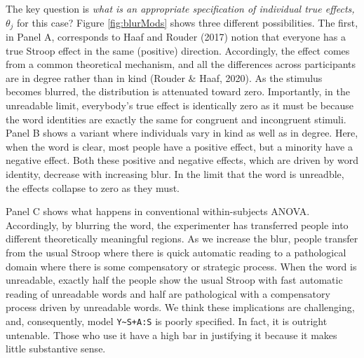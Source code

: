\documentclass[
  english,
  ,man]{apa6}
\begin{document}
The key question is \emph{what is an appropriate specification of individual true effects, \(\theta_j\)} for this case? Figure \ref{fig:blurMods} shows three different possibilities. The first, in Panel A, corresponds to Haaf and Rouder (2017) notion that everyone has a true Stroop effect in the same (positive) direction. Accordingly, the effect comes from a common theoretical mechanism, and all the differences across participants are in degree rather than in kind (Rouder \& Haaf, 2020). As the stimulus becomes blurred, the distribution is attenuated toward zero. Importantly, in the unreadable limit, everybody's true effect is identically zero as it must be because the word identities are exactly the same for congruent and incongruent stimuli. Panel B shows a variant where individuals vary in kind as well as in degree. Here, when the word is clear, most people have a positive effect, but a minority have a negative effect. Both these positive and negative effects, which are driven by word identity, decrease with increasing blur. In the limit that the word is unreadble, the effects collapse to zero as they must.

Panel C shows what happens in conventional within-subjects ANOVA. Accordingly, by blurring the word, the experimenter has transferred people into different theoretically meaningful regions. As we increase the blur, people transfer from the usual Stroop where there is quick automatic reading to a pathological domain where there is some compensatory or strategic process. When the word is unreadable, exactly half the people show the usual Stroop with fast automatic reading of unreadable words and half are pathological with a compensatory process driven by unreadable words. We think these implications are challenging, and, consequently, model \texttt{Y\textasciitilde{}S+A:S} is poorly specified. In fact, it is outright untenable. Those who use it have a high bar in justifying it because it makes little substantive sense.
\end{document}
